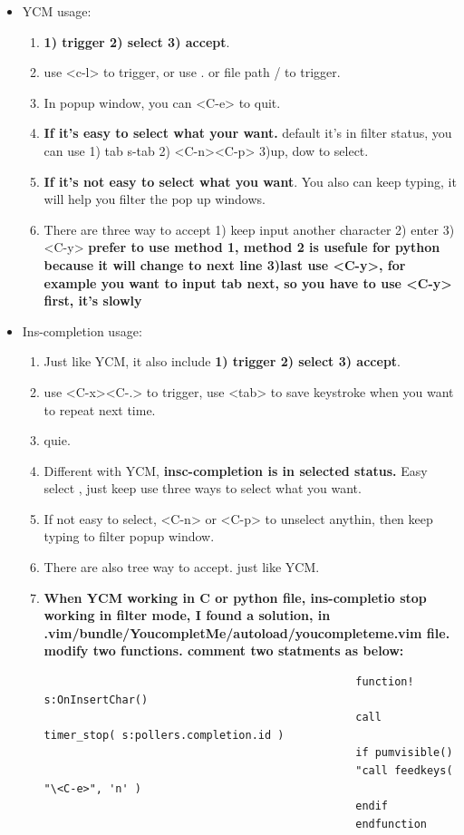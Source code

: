\documentclass[paper=8.5in:11in, twoside, 12pt, pagesize=pdftex]{book}
\begin{document}
\begin{itemize}
										\item YCM usage:
										\begin{enumerate}
											\item \textbf{1) trigger 2) select 3) accept}.
											\item use <c-l> to trigger, or use . or file path / to trigger.
											\item In popup window, you can <C-e> to quit.
											\item \textbf{If it's easy to select what your want.} default it's in filter status, you can use 1) tab s-tab 2) <C-n><C-p> 3)up, dow to select.
											\item \textbf{If it's not easy to select what you want}. You also can keep typing, it will help you filter the pop up windows.
											\item There are three way to accept 1) keep input another character 2) enter 3) <C-y> \textbf{prefer to use method 1, method 2 is usefule for python because it will change to next line 3)last use <C-y>, for example you want to input tab next, so you have to use <C-y> first, it's slowly}
										\end{enumerate}
										
										\item Ins-completion usage:
										\begin{enumerate}
											\item Just like YCM, it also include \textbf{1) trigger 2) select 3) accept}.
											\item use <C-x><C-.> to trigger, use <tab> to save keystroke when you want to repeat next time.
											\item <C-e> quie.
											\item Different with YCM, \textbf{insc-completion is in selected status.} Easy select , just keep use three ways to select what you want.
											\item If not easy to select, <C-n> or <C-p> to unselect anythin, then keep typing to filter popup window. 
											\item There are also tree way to accept. just like YCM.
											\item \textbf{When YCM working in C or python file, ins-completio stop working in filter mode, I found a solution, in .vim/bundle/YoucompletMe/autoload/youcompleteme.vim file. modify two functions. comment two statments as below:}
											
											\begin{verbatim}
												function! s:OnInsertChar()
												call timer_stop( s:pollers.completion.id )
												if pumvisible()
												"call feedkeys( "\<C-e>", 'n' )
												endif
												endfunction 
												

\end{verbatim}
\end{enumerate}
\end{itemize}
\end{document}
